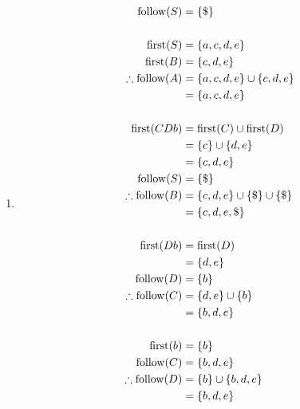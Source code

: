\documentclass[12pt,a4paper]{article}
\newcommand{\first}{\mathrm{first}}
\newcommand{\follow}{\mathrm{follow}}
\begin{document}
\begin{enumerate}
\begin{enumerate}
    \item %
    \begin{align*}
      \follow(S) &= \{\$\} \\
      \smallskip \\
      \first(S) &= \{a,c,d,e\} \\
      \first(B) &= \{c,d,e\} \\
      \therefore \follow(A) &= \{a,c,d,e\} \cup \{c,d,e\} \\
                            &= \{a,c,d,e\} \\
      \smallskip \\
      \first(CDb) &= \first(C) \cup \first(D) \\
                  &= \{c\} \cup \{d,e\} \\
                  &= \{c,d,e\} \\
      \follow(S)  &= \{\$\} \\
      \therefore \follow(B) &= \{c,d,e\} \cup \{\$\} \cup \{\$\} \\
                            &= \{c,d,e,\$\} \\
      \smallskip \\
      \first(Db) &= \first(D) \\
                 &= \{d,e\} \\
      \follow(D) &= \{b\} \\
      \therefore \follow(C) &= \{d,e\} \cup \{b\} \\
                            &= \{b,d,e\} \\
      \smallskip \\
      \first(b) &= \{b\} \\
      \follow(C) &= \{b,d,e\} \\
      \therefore \follow(D) &= \{b\} \cup \{b,d,e\} \\
                            &= \{b,d,e\}
    \end{align*}
  \end{enumerate}
\end{enumerate}
\end{document}
